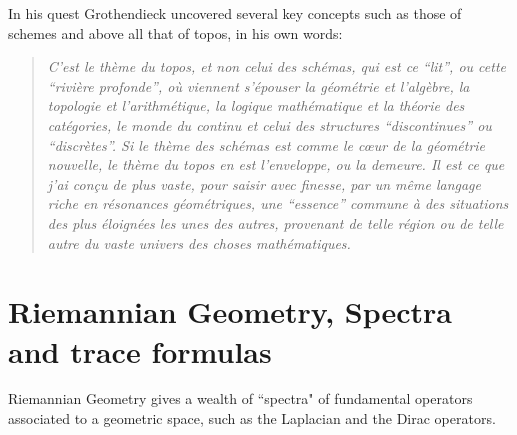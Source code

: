 \documentclass[12pt]{article}
\begin{document}
 In his quest Grothendieck uncovered several key concepts such as those of schemes and above all that of topos, in his own words:




\begin{quote}{\em
C'est le th\`eme du
topos, et non celui des sch\'emas, qui est ce ``lit'', ou cette ``rivi\`ere profonde'', o\`u viennent
s'\'epouser la g\'eom\'etrie et l'alg\`ebre, la topologie et l'arithm\'etique, la logique math\'ematique
et la th\'eorie des cat\'egories, le monde du continu et celui des structures ``discontinues'' ou
``discr\`etes''. Si le th\`eme des sch\'emas est comme le {\it c\oe ur} de la g\'eom\'etrie nouvelle, le th\`eme
du topos en est l'enveloppe, ou la {\it demeure}. Il est ce que j'ai con\c cu de plus vaste, pour
saisir avec finesse, par un m\^eme langage riche en r\'esonances g\'eom\'etriques, une ``essence''
commune \`a des situations des plus \'eloign\'ees les unes des autres, provenant de telle r\'egion
ou de telle autre du vaste univers des choses math\'ematiques.
}\end{quote}



\section{Riemannian Geometry, Spectra  and trace formulas} \label{analysisattack}
Riemannian Geometry gives a wealth of ``spectra" of fundamental operators associated to a geometric space, such as the Laplacian and the Dirac operators.
\end{document}
